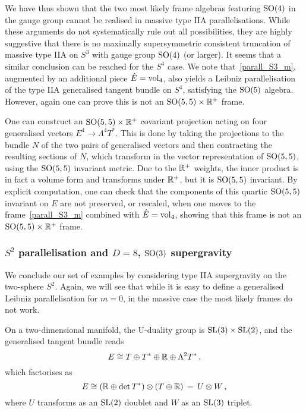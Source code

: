 \documentclass[debug]{phd}
\begin{document}
				We have thus shown that the two most likely frame algebras featuring $\mathrm{SO}(4)$ in the gauge group cannot be realised in massive type IIA parallelisations. While these arguments do not systematically rule out all possibilities, they are highly suggestive that there is no maximally supersymmetric consistent truncation of massive type IIA on $S^3$ with gauge group $\mathrm{SO}(4)$ (or larger).
				It seems that a similar conclusion can be reached for the $S^4$ case. 
				We note that~\eqref{parall_S3_m}, augmented by an additional piece $\hat{E} = \operatorname{vol}_4$, also yields a Leibniz parallelisation of the type IIA generalised tangent bundle on $S^4$, satisfying the $\mathrm{SO}(5)$ algebra. 					However, again one can prove this is not an $\mathrm{SO}(5,5)\times {\mathbb R}^+$ frame. 

				One can construct an $\mathrm{SO}(5,5)\times\mathbb{R}^+$ covariant projection acting on four generalised vectors $E^4 \rightarrow \Lambda^4 T^*$. 
				This is done by taking the projections to the bundle $N$ of the two pairs of generalised vectors and then contracting the resulting sections of $N$, which transform in the vector representation of $\mathrm{SO}(5,5)$, using the $\mathrm{SO}(5,5)$ invariant metric. Due to the $\mathbb{R}^+$ weights, the inner product is in fact a volume form and transforms under $\mathbb{R}^+$, but it is $\mathrm{SO}(5,5)$ invariant. 
				By explicit computation, one can check that the components of this quartic $\mathrm{SO}(5,5)$ invariant on $E$ are not preserved, or rescaled, when one moves to the frame~\eqref{parall_S3_m} combined with $\hat{E} = \operatorname{vol}_4$, showing that this frame is not an $\mathrm{SO}(5,5)\times\mathbb{R}^+$ frame.
		\subsubsection{\texorpdfstring{$S^2$ parallelisation and $D=8$, $\mathrm{SO}(3)$ supergravity}{S2 parallelisation and D=8, SO(3) supergravity}}
				We conclude our set of examples by considering type IIA supergravity on the two-sphere $S^2$. 
				Again, we will see that while it is easy to define a generalised Leibniz parallelisation for $m=0$, in the massive case the most likely frames do not work.

				On a two-dimensional manifold, the U-duality group is $\mathrm{SL}(3)\times \mathrm{SL}(2)$, and the generalised tangent bundle reads
						\begin{equation}
							E \cong T \oplus T^* \oplus \mathbb{R} \oplus \Lambda^2 T^*\, ,
						\end{equation}
				which factorises as
						\begin{equation}\label{2dEfactorised}
	E\cong (\mathbb{R} \oplus \det T^* ) \otimes ( T \oplus \mathbb{R})\, =\, U \otimes W \,,
						\end{equation}
				where $U$ transforms as an $\mathrm{SL}(2)$ doublet and $W$ as an $\mathrm{SL}(3)$ triplet.
\end{document}

